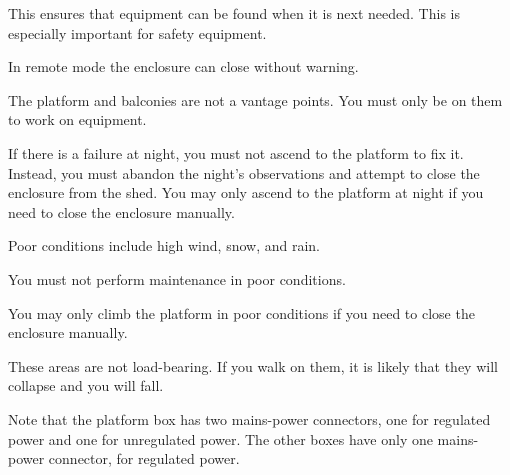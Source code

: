 
This ensures that equipment can be found when it is next needed. This is especially important for safety equipment.


In remote mode the enclosure can close without warning.


The platform and balconies are not a vantage points. You must only be on them to work on equipment.


If there is a failure at night, you must not ascend to the platform to fix it. Instead, you must abandon the night’s observations and attempt to close the enclosure from the shed. You may only ascend to the platform at night if you need to close the enclosure manually.


Poor conditions include high wind, snow, and rain.

You must not perform maintenance in poor conditions.

You may only climb the platform in poor conditions if you need to close the enclosure manually.


These areas are not load-bearing. If you walk on them, it is likely that they will collapse and you will fall.



Note that the platform box has two mains-power connectors, one for regulated power and one for unregulated power. The other boxes have only one mains-power connector, for regulated power.

